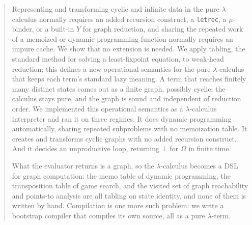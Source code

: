 \ifColambdaBody
\begin{abstract}
  Representing and transforming cyclic and infinite data in the pure $\lambda$-calculus normally requires an added recursion construct, a \texttt{letrec}, a $\mu$-binder, or a built-in $Y$ for graph reduction, and sharing the repeated work of a memoized or dynamic-programming function normally requires an impure cache. We show that no extension is needed. We apply tabling, the standard method for solving a least-fixpoint equation, to weak-head reduction; this defines a new operational semantics for the pure $\lambda$-calculus that keeps each term's standard lazy meaning. A term that reaches finitely many distinct states comes out as a finite graph, possibly cyclic; the calculus stays pure, and the graph is sound and independent of reduction order. We implemented this operational semantics as a $\lambda$-calculus interpreter and ran it on three regimes. It does dynamic programming automatically, sharing repeated subproblems with no memoization table. It creates and transforms cyclic graphs with no added recursion construct. And it decides an unproductive loop, returning $\bot$ for $\Omega$ in finite time.

  What the evaluator returns is a graph, so the $\lambda$-calculus becomes a DSL for graph computation: the memo table of dynamic programming, the transposition table of game search, and the visited set of graph reachability and points-to analysis are all tabling on state identity, and none of them is written by hand. Compilation is one more such problem: we write a bootstrap compiler that compiles its own source, all as a pure $\lambda$-term.
\end{abstract}


